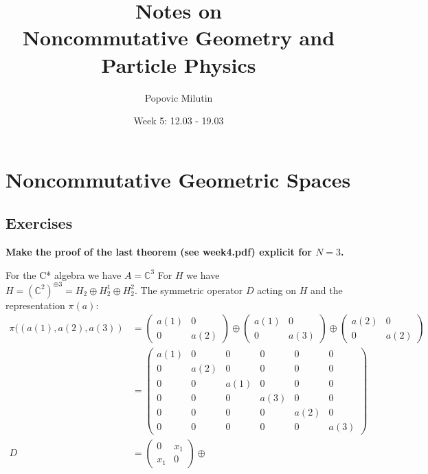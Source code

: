 \documentclass[a4paper]{article}
\title{Notes on \\ Noncommutative Geometry and Particle Physics}
\author{Popovic Milutin}
\date{Week 5: 12.03 - 19.03}
\newcounter{exercise}
\newenvironment{MyExercise}%
{\begin{mdframed}[style=exercisestyle]}{\end{mdframed}}
\theoremstyle{definition}
\theoremstyle{definition}
\theoremstyle{definition}
\theoremstyle{theorem}
\theoremstyle{theorem}
\begin{document}
\maketitle
\tableofcontents

\section{Noncommutative Geometric Spaces }
\subsection{Exercises}
\begin{MyExercise}
\textbf{
    Make the proof of the last theorem (see week4.pdf) explicit for $N=3$.
}\newline

    For the C* algebra we have $A=\mathbb{C}^3$
    For $H$ we have $H = (\mathbb{C}^2)^{\oplus 3} = H_2 \oplus H_2^1 \oplus H_2^2$.
    The symmetric operator $D$ acting on $H$ and the representation $\pi (a)$:
    \begin{align}
        \pi((a(1), a(2), a(3)) &=
        \begin{pmatrix}
            a(1) & 0 \\ 0 & a(2)
        \end{pmatrix} \oplus
        \begin{pmatrix}
            a(1) & 0 \\ 0 & a(3)
        \end{pmatrix} \oplus
        \begin{pmatrix}
            a(2) & 0 \\ 0 & a(2)
        \end{pmatrix} \nonumber  \\
        & =
        \begin{pmatrix}
            a(1) & 0 & 0 & 0 & 0 & 0 \\
            0    & a(2) & 0 & 0 & 0 & 0 \\
            0    & 0 & a(1) & 0 & 0 & 0 \\
            0    & 0 & 0 & a(3) & 0 & 0 \\
            0    & 0 & 0 & 0 & a(2) & 0 \\
            0    & 0 & 0 & 0 & 0 & a(3)
        \end{pmatrix} \\
        D &=
        \begin{pmatrix}
            0 & x_1 \\ x_1 & 0
        \end{pmatrix} \oplus

\end{align}
\end{MyExercise}
\end{document}
